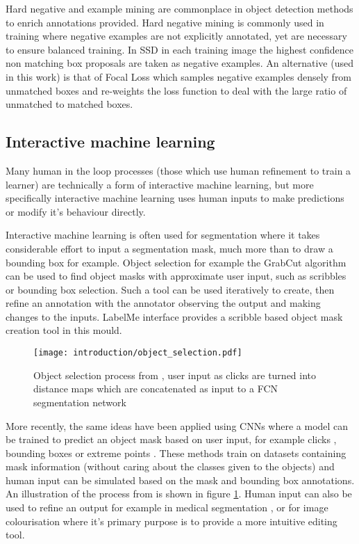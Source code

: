 Hard negative and example mining are commonplace in object detection methods to enrich annotations provided. Hard negative mining is commonly used in training where negative examples are not explicitly annotated, yet are necessary to ensure balanced training. In \gls{SSD} \cite{Liu2016a} in each training image the highest confidence non matching  box proposals are taken as negative examples. An alternative (used in this work) is that of Focal Loss \cite{Lin2017} which samples negative examples densely from unmatched boxes and re-weights the loss function to deal with the large ratio of unmatched to matched boxes.


\subsection{Interactive machine learning}

Many human in the loop processes (those which use human refinement to train a learner) are technically a form of interactive machine learning, but more specifically interactive machine learning uses human inputs to make predictions or modify it's behaviour directly.

Interactive machine learning is often used for segmentation where it takes considerable effort to input a segmentation mask, much more than to draw a bounding box for example. Object selection for example the GrabCut algorithm \cite{Rother} can be used to find object masks with approximate user input, such as scribbles or bounding box selection. Such a tool can be used iteratively to create, then refine an annotation with the annotator observing the output and making changes to the inputs.  LabelMe \cite{Russell2007} interface provides a scribble based object mask creation tool in this mould. 

\begin{figure}[h]
  \centering
  \texttt{[image: introduction/object\_selection.pdf]}
  \caption{Object selection process from \cite{Xu2016b}, user input as clicks are turned into distance maps which are concatenated as input to a \gls{FCN} segmentation network}  
  \label{fig:object_selection}
\end{figure}

More recently, the same ideas have been applied using \gls{CNN}s where a model can be trained to predict an object mask based on user input, for example clicks \cite{Xu2016b, Boroujerdi2017}, bounding boxes \cite {Xu2017} or extreme points \cite{Maninis2017}. These methods train on datasets containing mask information (without caring about the classes given to the objects) and human input can be simulated based on the mask and bounding box annotations. An illustration of the process from \cite{Xu2016b} is shown in figure \ref{fig:object_selection}. Human input can also be used to refine an output for example in medical segmentation \cite{Wang2017}, or for image colourisation \cite{Zhang} where it's primary purpose is to provide a more intuitive editing tool.

